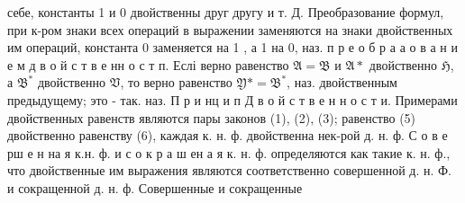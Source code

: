\documentclass[10pt]{article}
\begin{document}
себе, константы 1 и 0 двойственны друг другу и т. Д. Преобразование формул, при к-ром знаки всех операций в выражении заменяются на знаки двойственных им операций, константа 0 заменяется на 1 , а 1 на 0, наз. п р е о б р а $а$ о в а н и е м д в о й с т в е нн о с т п. Еслі верно равенство $\mathfrak{A}=\mathfrak{B}$ и $\mathfrak{A} *$ двойственно $\mathfrak{H}$, а $\mathfrak{B}^{*}$ двойственно $\mathfrak{V}$, то верно равенство $\mathfrak{Y} *=\mathfrak{B}^{*}$, наз. двойственным предыдущему; это - так. наз. П р и нц и п Д в о й с т в е н н о с т и. Примерами двойственных равенств являются пары законов (1), (2), (3); равенство (5) двойственно равенству (6), каждая к. н. ф. двойственна нек-рой д. н. ф. С о в е рш е н на я к.н. ф. и с о к р а ш ен а я к. н. ф. определяются как такие к. н. ф., что двойственные им выражения являются соответственно совершенной д. н. Ф. и сокращенной д. н. ф. Совершенные и сокращенные
\end{document}

